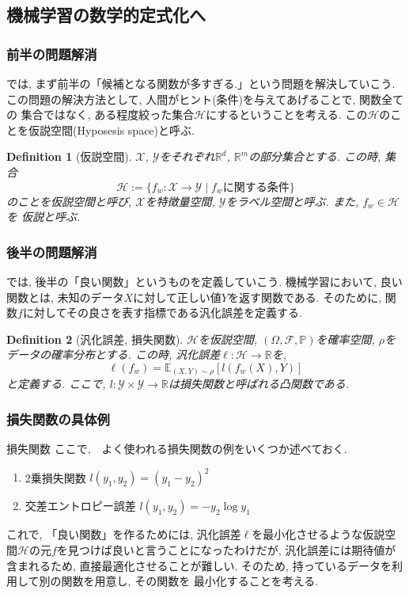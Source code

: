 \documentclass[dvipdfmx,11pt]{beamer}		%
\newtheorem{defi}{Definition}
\newcommand{\R}{\mathbb{R}}
\newcommand{\X}{\mathcal{X}}
\newcommand{\Y}{\mathcal{Y}}
\newcommand{\Hil}{\mathcal{H}}
\begin{document}
    \subsection{機械学習の数学的定式化へ}
    \begin{frame}\frametitle{前半の問題解消}
        では, まず前半の「候補となる関数が多すぎる.」という問題を解決していこう. \\ \indent
        この問題の解決方法として, 人間がヒント(条件)を与えてあげることで, 関数全ての
        集合ではなく, ある程度絞った集合$\Hil$にするということを考える. この$\Hil$のことを仮説空間(Hyposesis space)と呼ぶ.
        \begin{defi}[仮説空間]
            $\X$, $\Y$をそれぞれ$\R^d$, $\R^m$の部分集合とする. この時, 集合
            \begin{equation*}
                \Hil :=\{f_{w} :\X\to\Y\mid\text{$f_{w}$に関する条件}\}
            \end{equation*}
            のことを仮説空間と呼び, $\X$を特徴量空間, $\Y$をラベル空間と呼ぶ. また, $f_w\in\Hil$を
            仮説と呼ぶ. 
        \end{defi}
    \end{frame}
    \begin{frame}\frametitle{後半の問題解消}
        では, 後半の「良い関数」というものを定義していこう. 
        機械学習において, 良い関数とは, 未知のデータ$X$に対して正しい値$Y$を返す関数である. 
        そのために, 関数$f$に対してその良さを表す指標である汎化誤差を定義する.
        \begin{defi}[汎化誤差, 損失関数]
            $\Hil$を仮説空間, $(\Omega, \mathcal{F}, \mathbb{P})$を確率空間, $\rho$をデータの確率分布とする.
            この時, 汎化誤差$\ell:\Hil\to\R$を, 
            \begin{equation*}
                \ell(f_{w}) = \mathbb{E}_{(X, Y)\sim\rho}[l(f_{w}(X), Y)]
            \end{equation*}
            と定義する. ここで, $l:\Y\times\Y\to\R$は損失関数と呼ばれる凸関数である. 
        \end{defi}
    \end{frame}
    \begin{frame}
        \frametitle{損失関数の具体例}
        \begin{block}{損失関数}
            ここで,　よく使われる損失関数の例をいくつか述べておく. 
            \begin{enumerate}
                \item 2乗損失関数 $l(y_1, y_2) = (y_1 - y_2)^2$
                \item 交差エントロピー誤差 $l(y_1, y_2) = -y_2\log y_1$
            \end{enumerate}
        \end{block}
        これで, 「良い関数」を作るためには, 汎化誤差$\ell$を最小化させるような仮説空間$\Hil$の元$f$を見つけば良いと言うことになったわけだが, 
        汎化誤差には期待値が含まれるため, 直接最適化させることが難しい. そのため, 持っているデータを利用して別の関数を用意し, その関数を
        最小化することを考える. 
    \end{frame}
\end{document}
